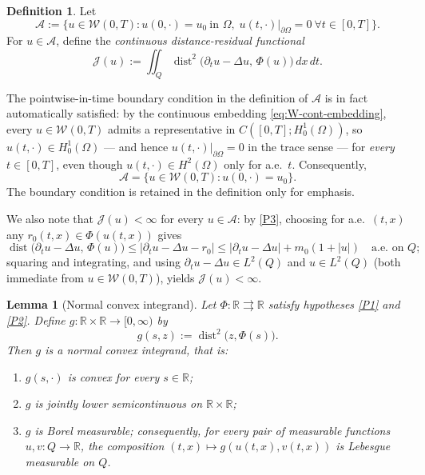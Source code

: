 \documentclass[11pt]{elsarticle}
\newtheorem{lemma}[theorem]{Lemma}
\theoremstyle{definition}
\newtheorem{definition}[theorem]{Definition}
\theoremstyle{remark}
\numberwithin{equation}{section}
\def\dist{\operatorname{dist}}
\begin{document}
	
	
	\begin{definition}\label{def:admissible-pde}
		Let
		\[
		\mathcal{A}
		:=
		\bigl\{u\in\mathcal{W}(0,T):
		u(0,\cdot)=u_0\ \text{in }\Omega,\;
		u(t,\cdot)|_{\partial\Omega}=0\ \forall t\in[0,T]
		\bigr\}.
		\]
		For $u\in\mathcal{A}$, define the \emph{continuous distance-residual
			functional}
		\[
		\mathcal{J}(u)
		:=
		\iint_{Q}\dist^2\bigl(\partial_t u-\Delta u,\,\Phi(u)\bigr)\,dx\,dt.
		\]
	\end{definition}
	The pointwise-in-time boundary condition in the definition of
	$\mathcal{A}$ is in fact automatically satisfied: by the continuous
	embedding \eqref{eq:W-cont-embedding}, every $u\in\mathcal{W}(0,T)$
	admits a representative in $C([0,T];H^1_0(\Omega))$, so
	$u(t,\cdot)\in H_0^1(\Omega)$ --- and hence
	$u(t,\cdot)|_{\partial\Omega}=0$ in the trace sense --- for
	\emph{every} $t\in[0,T]$, even though $u(t,\cdot)\in H^2(\Omega)$
	only for a.e.\ $t$. Consequently,
	\[
	\mathcal{A}=\{u\in\mathcal{W}(0,T):u(0,\cdot)=u_0\}.
	\]
	The boundary condition is retained in the definition only for emphasis.
	
	We also note that $\mathcal{J}(u)<\infty$ for every
	$u\in\mathcal{A}$: by \ref{P3}, choosing for a.e.\ $(t,x)$ any
	$r_0(t,x)\in\Phi(u(t,x))$ gives
	\[
	\dist\bigl(\partial_t u-\Delta u,\,\Phi(u)\bigr)
	\le|\partial_t u-\Delta u-r_0|
	\le|\partial_t u-\Delta u|+m_0(1+|u|)
	\quad\text{a.e.\ on } Q;
	\]
	squaring and integrating, and using $\partial_t u-\Delta u\in L^2(Q)$
	and $u\in L^2(Q)$ (both immediate from $u\in\mathcal{W}(0,T)$),
	yields $\mathcal{J}(u)<\infty$.
\begin{lemma}[Normal convex integrand]\label{lem:normal-integrand-parabolic}
	Let $\Phi:\mathbb{R}\rightrightarrows\mathbb{R}$ satisfy hypotheses \ref{P1} and \ref{P2}.
	Define $g:\mathbb{R}\times\mathbb{R}\to[0,\infty)$ by
	\[
	g(s,z):=\operatorname{dist}^2\bigl(z,\Phi(s)\bigr).
	\]
	Then $g$ is a normal convex integrand, that is:
	\begin{enumerate}
		\item[(a)] $g(s,\cdot)$ is convex for every $s\in\mathbb{R}$;
		\item[(b)] $g$ is jointly lower semicontinuous on $\mathbb{R}\times\mathbb{R}$;
		\item[(c)] $g$ is Borel measurable; consequently, for every pair of measurable
		functions $u,v:Q\to\mathbb{R}$, the composition $(t,x)\mapsto g(u(t,x),v(t,x))$
		is Lebesgue measurable on $Q$.
	\end{enumerate}
\end{lemma}
\end{document}
